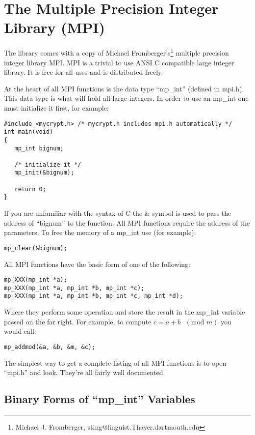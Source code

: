 \documentclass{book}
\begin{document}
\section{The Multiple Precision Integer Library (MPI)}
The library comes with a copy of Michael Fromberger's\footnote{Michael J. Fromberger, sting@linguist.Thayer.dartmouth.edu} multiple
precision integer library MPI.  MPI is a trivial to use ANSI C compatible large integer library.  It is free for all uses and
is distributed freely.

At the heart of all MPI functions is the data type ``mp\_int'' (defined in mpi.h).  This data type is what will hold all large
integers.  In order to use an mp\_int one must initialize it first, for example:
\begin{verbatim}
#include <mycrypt.h> /* mycrypt.h includes mpi.h automatically */
int main(void)
{ 
   mp_int bignum;
   
   /* initialize it */
   mp_init(&bignum);

   return 0;
}
\end{verbatim}
If you are unfamiliar with the syntax of C the \& symbol is used to pass the address of ``bignum'' to the function.  All
MPI functions require the address of the parameters.  To free the memory of a mp\_int use (for example):
\begin{verbatim}
mp_clear(&bignum);
\end{verbatim}

All MPI functions have the basic form of one of the following:
\begin{verbatim}
mp_XXX(mp_int *a);
mp_XXX(mp_int *a, mp_int *b, mp_int *c);
mp_XXX(mp_int *a, mp_int *b, mp_int *c, mp_int *d);
\end{verbatim}

Where they perform some operation and store the result in the mp\_int variable passed on the far right.  For example, to
compute $c = a + b \mbox{ }(\mbox{mod }m)$ you would call:
\begin{verbatim}
mp_addmod(&a, &b, &m, &c);
\end{verbatim}

The simplest way to get a complete listing of all MPI functions is to open ``mpi.h'' and look.  They're all fairly 
well documented.

\subsection{Binary Forms of ``mp\_int'' Variables}
\end{document}
